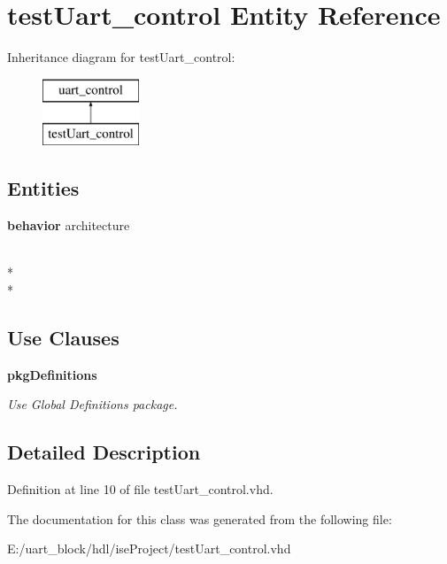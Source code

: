 \section{test\-Uart\-\_\-control Entity Reference}
\label{classtest_uart__control}
Inheritance diagram for test\-Uart\-\_\-control\-:\begin{figure}[H]
\begin{center}
\leavevmode
\includegraphics[height=2.000000cm]{classtest_uart__control}
\end{center}
\end{figure}
\subsection*{Entities}
\begin{DoxyCompactItemize}
\item 
{\bf behavior} architecture
\end{DoxyCompactItemize}
\\*
\\*
\subsection*{Use Clauses}
 \begin{DoxyCompactItemize}
\item 
{\bf pkg\-Definitions}   \label{classtest_uart__control_ac442dca664056131bdaf5c92e4351e01}

\begin{DoxyCompactList}\small\item\em Use Global Definitions package. \end{DoxyCompactList}\end{DoxyCompactItemize}


\subsection{Detailed Description}


Definition at line 10 of file test\-Uart\-\_\-control.\-vhd.



The documentation for this class was generated from the following file\-:\begin{DoxyCompactItemize}
\item 
E\-:/uart\-\_\-block/hdl/ise\-Project/test\-Uart\-\_\-control.\-vhd\end{DoxyCompactItemize}
